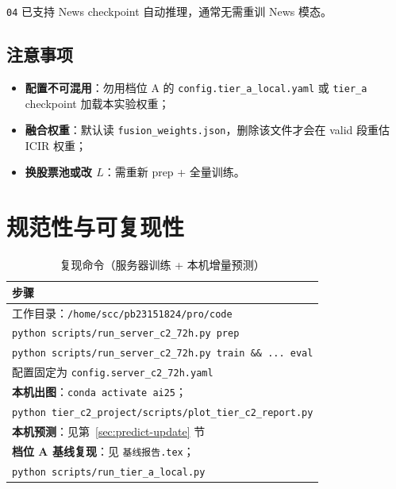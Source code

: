 \documentclass[UTF8,a4paper,12pt]{ctexart}
\begin{document}
\texttt{04} 已支持 News checkpoint 自动推理，通常无需重训 News 模态。

\subsection{注意事项}

\begin{itemize}[leftmargin=2em]
  \item \textbf{配置不可混用}：勿用档位 A 的 \texttt{config.tier\_a\_local.yaml} 或 \texttt{tier\_a} checkpoint 加载本实验权重；
  \item \textbf{融合权重}：默认读 \texttt{fusion\_weights.json}，删除该文件才会在 valid 段重估 ICIR 权重；
  \item \textbf{换股票池或改 $L$}：需重新 prep + 全量训练。
\end{itemize}

\section{规范性与可复现性}

\begin{table}[H]
\centering
\caption{复现命令（服务器训练 + 本机增量预测）}
\label{tab:repro}
\begin{tabular}{p{11cm}}
\toprule
\textbf{步骤} \\
\midrule
工作目录：\texttt{/home/scc/pb23151824/pro/code} \\
\texttt{python scripts/run\_server\_c2\_72h.py prep} \\
\texttt{python scripts/run\_server\_c2\_72h.py train \&\& ... eval} \\
配置固定为 \texttt{config.server\_c2\_72h.yaml} \\
\midrule
\textbf{本机出图}：\texttt{conda activate ai25}；\\
\texttt{python tier\_c2\_project/scripts/plot\_tier\_c2\_report.py} \\
\textbf{本机预测}：见第~\ref{sec:predict-update} 节 \\
\midrule
\textbf{档位 A 基线复现}：见 \texttt{基线报告.tex}；\\
\texttt{python scripts/run\_tier\_a\_local.py} \\
\bottomrule
\end{tabular}
\end{table}
\end{document}
